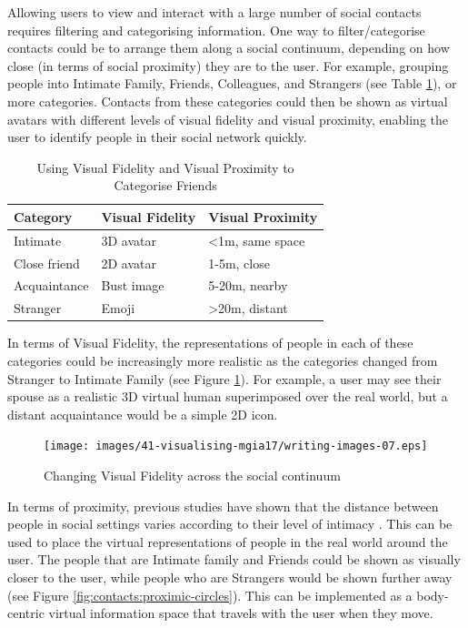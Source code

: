 Allowing users to view and interact with a large number of social contacts requires filtering and categorising information. One way to filter/categorise contacts could be to arrange them along a social continuum, depending on how close (in terms of social proximity) they are to the user. For example, grouping people into Intimate Family, Friends, Colleagues, and Strangers (see Table \ref{tbl:visual-fidelity-proximity}), or more categories. Contacts from these categories could then be shown as virtual avatars with different levels of visual fidelity and visual proximity, enabling the user to identify people in their social network quickly.

\begin{table}[h]
    \centering
    \caption{Using Visual Fidelity and Visual Proximity to Categorise Friends}
    \label{tbl:visual-fidelity-proximity}
    \begin{tabular}{|l|l|l|}
        \hline
        \textbf{Category} & \textbf{Visual Fidelity}    & \textbf{Visual Proximity}       \\ \hline
        Intimate          & 3D avatar                     & \textless1m, same space  \\ \hline
        Close friend      & 2D avatar                   & 1-5m, close              \\ \hline
        Acquaintance      & Bust image                    & 5-20m, nearby            \\ \hline
        Stranger          & Emoji                        & \textgreater20m, distant \\ \hline
    \end{tabular}
\end{table}


In terms of Visual Fidelity, the representations of people in each of these categories could be increasingly more realistic as the categories changed from Stranger to Intimate Family (see Figure \ref{fig:contacts:visual-fidelity-continuum}). For example, a user may see their spouse as a realistic 3D virtual human superimposed over the real world, but a distant acquaintance would be a simple 2D icon.

\begin{figure}[h]
    \centering
    \texttt{[image: images/41-visualising-mgia17/writing-images-07.eps]}
    \caption{Changing Visual Fidelity across the social continuum}
    \label{fig:contacts:visual-fidelity-continuum}
\end{figure}

In terms of proximity, previous studies have shown that the distance between people in social settings varies according to their level of intimacy \cite{Anslow2016}. This can be used to place the virtual representations of people in the real world around the user. The people that are Intimate family and Friends could be shown as visually closer to the user, while people who are Strangers would be shown further away (see Figure \ref{fig:contacts:proximic-circles}). This can be implemented as a body-centric virtual information space that travels with the user when they move.

